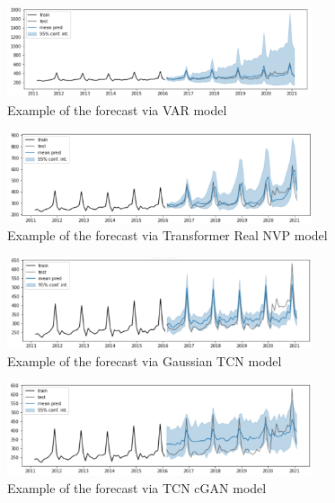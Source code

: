 \documentclass[12pt,a4paper]{article}
\begin{document}
\begin{figure}[!ht]
    \centering
    \includegraphics[width=0.8\textwidth]{var.png}
    \caption{Example of the forecast via VAR model}
    \label{fig:var}
\end{figure}

\begin{figure}[!ht]
    \centering
    \includegraphics[width=0.8\textwidth]{transformer_realnvp.png}
    \caption{Example of the forecast via Transformer Real NVP model}
    \label{fig:transformer_realnvp}
\end{figure}

\begin{figure}[!ht]
    \centering
    \includegraphics[width=0.8\textwidth]{gaussian_tcn.png}
    \caption{Example of the forecast via Gaussian TCN model}
    \label{fig:gaussian_tcn}
\end{figure}

\begin{figure}[!ht]
    \centering
    \includegraphics[width=0.8\textwidth]{tcn_cgan.png}
    \caption{Example of the forecast via TCN cGAN model}
    \label{fig:tcn_cgan}
\end{figure}
\end{document}
